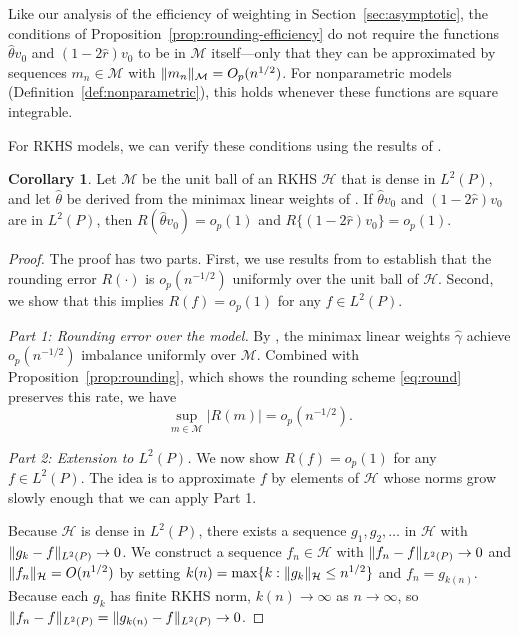 \documentclass{article}
\newcommand{\paragraph}[1]{\par\noindent\textit{#1}\enspace}
\DeclarePairedDelimiter\norm{\lVert}{\rVert}
\theoremstyle{definition}
\newtheorem{corollary}[theorem]{Corollary}
\newcommand{\calH}{\ensuremath{\mathcal{H}}}
\newcommand{\model}{\mathcal{M}}
\newcommand{\<}{\langle}
\renewcommand{\>}{\rangle}
\begin{document}
\begin{refsection}
Like our analysis of the efficiency of weighting in Section~\ref{sec:asymptotic}, the conditions of Proposition~\ref{prop:rounding-efficiency} do not require the functions $\hat\theta v_0$ and $(1-2\hat r) v_0$ to be in $\model$ itself---only that they can be approximated by sequences $m_n \in \model$ with $\norm{m_n}_\model = O_p(n^{1/2})$. For nonparametric models (Definition~\ref{def:nonparametric}), this holds whenever these functions are square integrable.

For RKHS models, we can verify these conditions using the results of \citet{hirshberg2019minimax}.

\begin{corollary}
\label{cor:rounding-efficiency-rkhs}
Let $\model$ be the unit ball of an RKHS $\calH$ that is dense in $L^2(P)$, and let $\hat\theta$ be derived from the minimax linear weights of \citet{hirshberg2019minimax}. If $\hat\theta v_0$ and $(1-2\hat r)v_0$ are in $L^2(P)$, then $R(\hat\theta v_0) = o_p(1)$ and $R\{(1-2\hat r)v_0\} = o_p(1)$.
\end{corollary}

\begin{proof}
The proof has two parts. First, we use results from \citet{hirshberg2019minimax} to establish that the rounding error $R(\cdot)$ is $o_p(n^{-1/2})$ uniformly over the unit ball of $\calH$. Second, we show that this implies $R(f) = o_p(1)$ for any $f \in L^2(P)$.

\paragraph{Part 1: Rounding error over the model.}
By \citet[Theorem 2]{hirshberg2019minimax}, the minimax linear weights $\hat\gamma$ achieve $o_p(n^{-1/2})$ imbalance uniformly over $\model$. Combined with Proposition~\ref{prop:rounding}, which shows the rounding scheme \eqref{eq:round} preserves this rate, we have
\[
\sup_{m \in \model} |R(m)| = o_p(n^{-1/2}).
\]

\paragraph{Part 2: Extension to $L^2(P)$.}
We now show $R(f) = o_p(1)$ for any $f \in L^2(P)$. The idea is to approximate $f$ by elements of $\calH$ whose norms grow slowly enough that we can apply Part 1.

Because $\calH$ is dense in $L^2(P)$, there exists a sequence $g_1, g_2, \ldots$ in $\calH$ with $\norm{g_k - f}_{L^2(P)} \to 0$. We construct a sequence $f_n \in \calH$ with $\norm{f_n - f}_{L^2(P)} \to 0$ and $\norm{f_n}_\calH = O(n^{1/2})$ by setting $k(n) = \max\{k : \norm{g_k}_\calH \le n^{1/2}\}$ and $f_n = g_{k(n)}$. Because each $g_k$ has finite RKHS norm, $k(n) \to \infty$ as $n \to \infty$, so $\norm{f_n - f}_{L^2(P)} = \norm{g_{k(n)} - f}_{L^2(P)} \to 0$.


\end{proof}
\end{refsection}
\end{document}
